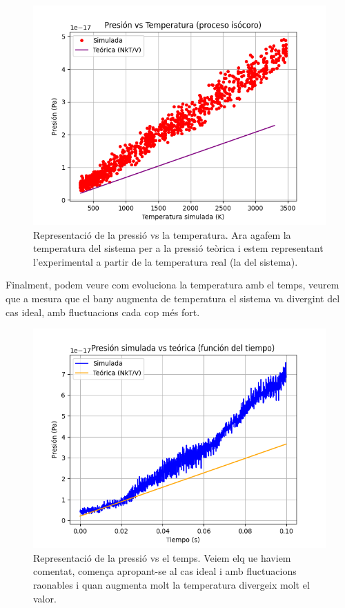 \documentclass{article}
\begin{document}
	\begin{figure}[h!]
		\centering
		\includegraphics[width=0.7\linewidth]{Q2_2.png}
		\caption{Representació de la pressió vs la temperatura. Ara agafem la temperatura del sistema per a la pressió teòrica i estem representant l'experimental a partir de la temperatura real (la del sistema). }
		\label{4}
	\end{figure}
	
	Finalment, podem veure com evoluciona la temperatura amb el temps, veurem que a mesura que el bany augmenta de temperatura el sistema va divergint del cas ideal, amb fluctuacions cada cop més fort. 
	
	\begin{figure}[h!]
	\centering
	\includegraphics[width=0.7\linewidth]{Q2_3.png}
	\caption{Representació de la pressió vs el temps. Veiem elq ue haviem comentat, comença apropant-se al cas ideal i amb fluctuacions raonables i quan augmenta molt la temperatura divergeix molt el valor. }
	\label{4}
	\end{figure}
	
	
\end{document}

